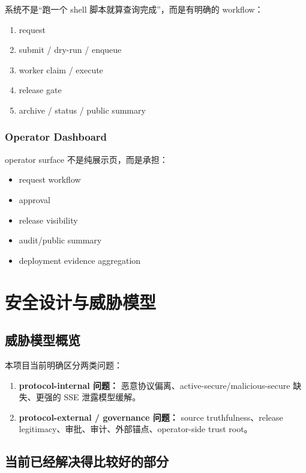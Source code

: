 \documentclass[UTF8,a4paper,12pt,oneside]{ctexrep}
\begin{document}
系统不是“跑一个 shell 脚本就算查询完成”，而是有明确的 workflow：

\begin{enumerate}
  \item request
  \item submit / dry-run / enqueue
  \item worker claim / execute
  \item release gate
  \item archive / status / public summary
\end{enumerate}

\subsection{Operator Dashboard}

operator surface 不是纯展示页，而是承担：

\begin{itemize}
  \item request workflow
  \item approval
  \item release visibility
  \item audit/public summary
  \item deployment evidence aggregation
\end{itemize}

\chapter{安全设计与威胁模型}

\section{威胁模型概览}

本项目当前明确区分两类问题：

\begin{enumerate}
  \item \textbf{protocol-internal 问题：}
  恶意协议偏离、active-secure/malicious-secure 缺失、更强的 SSE 泄露模型缓解。
  \item \textbf{protocol-external / governance 问题：}
  source truthfulness、release legitimacy、审批、审计、外部锚点、operator-side trust root。
\end{enumerate}

\section{当前已经解决得比较好的部分}
\end{document}
